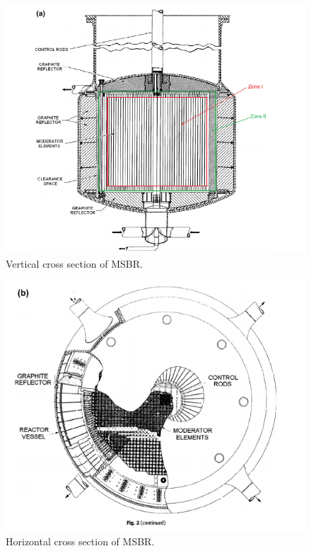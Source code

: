 \documentclass{article}
\begin{document}
\begin{figure}[htpb]
  \centering
  \includegraphics[max height=.5\textheight,max width=\textwidth,keepaspectratio]{vertical_MSBR_cross_section.png}
  \caption{Vertical cross section of MSBR.}
  \label{fig:vertical}
\end{figure}
\begin{figure}[htpb]
  \centering
  \includegraphics[max height=.5\textheight,max width=\textwidth,keepaspectratio]{horizontal_MSBR_cross_section.png}
  \caption{Horizontal cross section of MSBR.}
  \label{fig:horizontal}
\end{figure}
\end{document}

